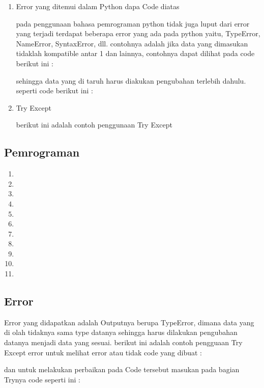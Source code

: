 \begin{enumerate}
\item Error yang ditemui dalam Python dapa Code diatas
\par pada penggunaan bahasa pemrograman python tidak juga luput dari error yang terjadi terdapat beberapa error yang ada pada python yaitu, TypeError, NameError, SyntaxError, dll. contohnya adalah jika data yang dimasukan tidaklah kompatible antar 1 dan lainnya, contohnya dapat dilihat pada code berikut ini :

\par sehingga data yang di taruh harus diakukan pengubahan terlebih dahulu. seperti code berikut ini :


\item Try Except
\par berikut ini adalah contoh penggunaan Try Except

\end{enumerate}

\subsection{Pemrograman}
\begin{enumerate}
\item 
\item 
\item 
\item 
\item 
\item 
\item 
\item 
\item 
\item 
\item 
\end{enumerate}

\subsection{Error}
\par Error yang didapatkan adalah Outputnya berupa TypeError, dimana data yang di olah tidaknya sama type datanya sehingga harus dilakukan pengubahan datanya menjadi data yang sesuai. berikut ini adalah contoh pengguaan Try Except error untuk melihat error atau tidak code yang dibuat :

\par dan untuk melakukan perbaikan pada Code tersebut masukan pada bagian Trynya code seperti ini :
